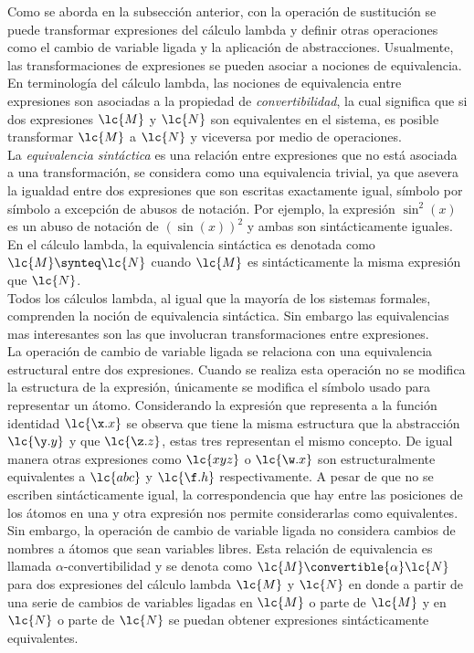 Como se aborda en la subsección anterior, con la operación de sustitución se
puede transformar expresiones del cálculo lambda y definir otras operaciones
como el cambio de variable ligada y la aplicación de abstracciones. Usualmente,
las transformaciones de expresiones se pueden asociar a nociones de
equivalencia. En terminología del cálculo lambda, las nociones de equivalencia
entre expresiones son asociadas a la propiedad de \emph{convertibilidad}, la
cual significa que si dos expresiones \(\lc{M}\) y \(\lc{N}\) son equivalentes en
el sistema, es posible transformar \(\lc{M}\) a \(\lc{N}\) y viceversa por medio
de operaciones. \\

La \emph{equivalencia sintáctica} es una relación entre expresiones que no está
asociada a una transformación, se considera como una equivalencia trivial, ya
que asevera la igualdad entre dos expresiones que son escritas exactamente
igual, símbolo por símbolo a excepción de abusos de notación. Por ejemplo, la
expresión \(\sin^{2}\left( x \right)\) es un abuso de notación de \(\left(
  \sin\left( x \right) \right)^{2}\) y ambas son sintácticamente iguales. En el
cálculo lambda, la equivalencia sintáctica es denotada como \(\lc{M} \synteq
\lc{N}\) cuando \(\lc{M}\) es sintácticamente la misma expresión que \(\lc{N}\).
\\

Todos los cálculos lambda, al igual que la mayoría de los sistemas formales,
comprenden la noción de equivalencia sintáctica. Sin embargo las equivalencias
mas interesantes son las que involucran transformaciones entre expresiones. \\

La operación de cambio de variable ligada se relaciona con una equivalencia
estructural entre dos expresiones. Cuando se realiza esta operación no se
modifica la estructura de la expresión, únicamente se modifica el símbolo usado
para representar un átomo. Considerando la expresión que representa a la función
identidad \(\lc{\x.x}\) se observa que tiene la misma estructura que la
abstracción \(\lc{\y.y}\) y que \(\lc{\z.z}\), estas tres representan el mismo
concepto. De igual manera otras expresiones como \(\lc{x y z}\) o \(\lc{\w.x}\)
son estructuralmente equivalentes a \(\lc{a b c}\) y \(\lc{\f.h}\)
respectivamente. A pesar de que no se escriben sintácticamente igual, la
correspondencia que hay entre las posiciones de los átomos en una y otra
expresión nos permite considerarlas como equivalentes. Sin embargo, la operación
de cambio de variable ligada no considera cambios de nombres a átomos que sean
variables libres. Esta relación de equivalencia es llamada
\(\alpha\)-convertibilidad y se denota como \(\lc{M} \convertible{\alpha}
\lc{N}\) para dos expresiones del cálculo lambda \(\lc{M}\) y \(\lc{N}\) en
donde a partir de una serie de cambios de variables ligadas en \(\lc{M}\) o
parte de \(\lc{M}\) y en \(\lc{N}\) o parte de \(\lc{N}\) se puedan obtener
expresiones sintácticamente equivalentes. \\

